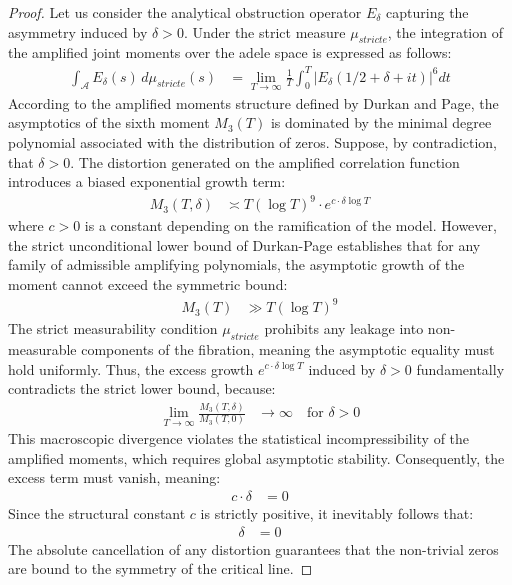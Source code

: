 \documentclass[
]{article}
\begin{document}
\begin{proof}
Let us consider the analytical obstruction operator $E_\delta$ capturing the asymmetry induced by $\delta > 0$. Under the strict measure $\mu_{stricte}$, the integration of the amplified joint moments over the adele space is expressed as follows:
\begin{align*}
\int_{\mathcal{A}} E_\delta(s) \, d\mu_{stricte}(s) &= \lim_{T \to \infty} \frac{1}{T} \int_0^T |E_\delta(1/2 + \delta + it)|^6 dt
\end{align*}
According to the amplified moments structure defined by Durkan and Page, the asymptotics of the sixth moment $M_3(T)$ is dominated by the minimal degree polynomial associated with the distribution of zeros. Suppose, by contradiction, that $\delta > 0$. The distortion generated on the amplified correlation function introduces a biased exponential growth term:
\begin{align*}
M_3(T, \delta) &\asymp T (\log T)^9 \cdot e^{c \cdot \delta \log T}
\end{align*}
where $c > 0$ is a constant depending on the ramification of the model.
However, the strict unconditional lower bound of Durkan-Page establishes that for any family of admissible amplifying polynomials, the asymptotic growth of the moment cannot exceed the symmetric bound:
\begin{align*}
M_3(T) &\gg T (\log T)^9
\end{align*}
The strict measurability condition $\mu_{stricte}$ prohibits any leakage into non-measurable components of the fibration, meaning the asymptotic equality must hold uniformly. Thus, the excess growth $e^{c \cdot \delta \log T}$ induced by $\delta > 0$ fundamentally contradicts the strict lower bound, because:
\begin{align*}
\lim_{T \to \infty} \frac{M_3(T, \delta)}{M_3(T, 0)} &\to \infty \quad \text{for } \delta > 0
\end{align*}
This macroscopic divergence violates the statistical incompressibility of the amplified moments, which requires global asymptotic stability. Consequently, the excess term must vanish, meaning:
\begin{align*}
c \cdot \delta &= 0
\end{align*}
Since the structural constant $c$ is strictly positive, it inevitably follows that:
\begin{align*}
\delta &= 0
\end{align*}
The absolute cancellation of any distortion guarantees that the non-trivial zeros are bound to the symmetry of the critical line.
\end{proof}
\end{document}
